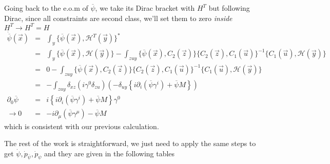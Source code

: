 \documentclass[aps,preprint,preprintnumbers,nofootinbib,showpacs,prd]{revtex4-1}
\newcommand{\nbea}{\begin{eqnarray*}}
\newcommand{\neea}{\end{eqnarray*}}
\begin{document}
Going back to the e.o.m of $\overline \psi$, we take its Dirac bracket with $H^T$ but following Dirac, since all constraints are second class, we'll set them to zero {\it inside} $H^T \to H^T = H$
%
\nbea
\dot {\overline \psi}(\vec x) & = & \int_y\{\overline \psi(\vec x), \mathcal{H}^T(\vec y)\}^*\\
& = & \int_y \{\overline \psi(\vec x), \mathcal{H}(\vec y)\} - \int_{zuy}\{\overline \psi(\vec x), C_2(\vec z)\}\{C_2(\vec z), C_1(\vec u)\}^{-1}\{C_1(\vec u), \mathcal{H}(\vec y)\} \\
& = & 0 - \int_{zuy}\{\overline \psi(\vec x), C_2(\vec z)\}\{C_2(\vec z), C_1(\vec u)\}^{-1}\{C_1(\vec u), \mathcal{H}(\vec y)\} \\
& = & - \int_{zuy}\delta_{xz} (i \gamma^0 \delta_{zu}) \left ( - \delta_{uy} \left \{ i \partial_{i}(\overline \psi \gamma^{i}) + \overline \psi M \right \} \right ) \\
\partial_0 \overline \psi & = & i \left \{ i \partial_{i}(\overline \psi \gamma^{i}) + \overline \psi M \right \} \gamma^0 \\
\to 0 & = & -i \partial_{\mu}(\overline \psi \gamma^{\mu}) - \overline \psi M 
\neea
%
which is consistent with our previous calculation.

The rest of the work is straightforward, we just need to apply the same steps to get $\dot \psi, \dot p_{\overline \psi}, \dot p_\psi$ and they are given in the following tables
\end{document}
